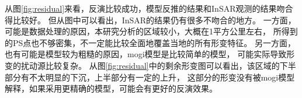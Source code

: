 从图\ref{fig:residual}来看，反演比较成功，模型反推的结果和InSAR观测的结果吻合得比较好。
但从图中可以看出，InSAR的结果仍有很多不吻合的地方。
一方面，可能是数据处理的原因，本研究分析的区域较小，大概在1平方公里左右，
所得到的PS点也不够密集，不一定能比较全面地覆盖当地的所有形变特征。
另一方面，也有可能是模型较为粗糙的原因，mogi模型是比较简单的模型，
可能实际导致形变的扰动源比较复杂。
从图\ref{fig:residual}中的剩余形变图可以看出，该区域的下半部分有不太明显的下沉，上半部分有一定的上升，
这部分的形变没有被mogi模型解释，如果采用更精确的模型，可能会有更好的反演效果。